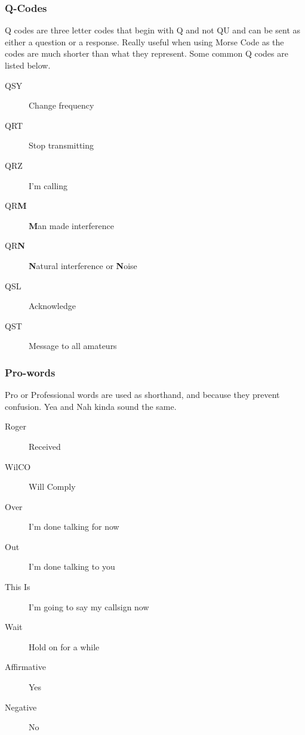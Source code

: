 \documentclass[10pt, handout]{beamer}
\begin{document}
\begin{frame}
\frametitle{Q-Codes}
Q codes are three letter codes that begin with Q and not QU and can be sent as either a question or a response. Really useful when using Morse Code as the codes are much shorter than what they represent. Some common Q codes are listed below.
\begin{description}
\item[QSY] Change frequency
\item[QRT] Stop transmitting
\item[QRZ] I'm calling
\item[QR\textbf<2->{M}] \textbf<2->{M}an made interference
\item[QR\textbf<2->{N}] \textbf<2->{N}atural interference or \textbf<2->{N}oise
\item[QSL] Acknowledge
\item[QST] Message to all amateurs
\end{description}
\end{frame}

\begin{frame}
\frametitle{Pro-words}
Pro or Professional words are used as shorthand, and because they prevent confusion. Yea and Nah kinda sound the same.
\begin{description}
\item[Roger] Received
\item[WilCO] Will Comply
\item[Over] I'm done talking for now
\item[Out] I'm done talking to you
\item[This Is] I'm going to say my callsign now
\item[Wait] Hold on for a while
\item[Affirmative] Yes
\item[Negative] No
\end{description}
\end{frame}
\end{document}
